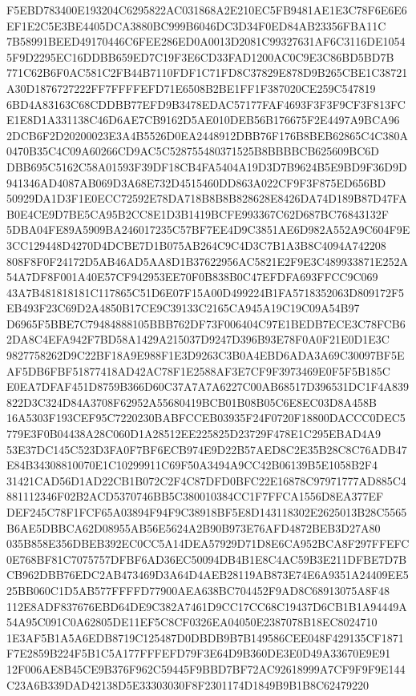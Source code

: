 \documentclass[UTF8,fontset=fandol,zihao=-4,a4paper]{ctexart}
\begin{document}
{{F5EBD783400E193204C6295822AC031868A2E210EC5FB9481AE1E3C78F6E6E6EF1E2C5E3BE4405DCA3880BC999B6046DC3D34F0ED84AB23356FBA11C
7B58991BEED49170446C6FEE286ED0A0013D2081C99327631AF6C3116DE10545F9D2295EC16DDBB659ED7C19F3E6CD33FAD1200AC0C9E3C86BD5BD7B
771C62B6F0AC581C2FB44B7110FDF1C71FD8C37829E878D9B265CBE1C38721A30D1876727222FF7FFFFEFD71E6508B2BE1FF1F387020CE259C547819
6BD4A83163C68CDDBB77EFD9B3478EDAC57177FAF4693F3F3F9CF3F813FCE1E8D1A331138C46D6AE7CB9162D5AE010DEB56B176675F2E4497A9BCA96
2DCB6F2D20200023E3A4B5526D0EA2448912DBB76F176B8BEB62865C4C380A0470B35C4C09A60266CD9AC5C528755480371525B8BBBBCB625609BC6D
DBB695C5162C58A01593F39DF18CB4FA5404A19D3D7B9624B5E9BD9F36D9D941346AD4087AB069D3A68E732D4515460DD863A022CF9F3F875ED656BD
50929DA1D3F1E0ECC72592E78DA718B8B8B828628E8426DA74D189B87D47FAB0E4CE9D7BE5CA95B2CC8E1D3B1419BCFE993367C62D687BC76843132F
5DBA04FE89A5909BA246017235C57BF7EE4D9C3851AE6D982A552A9C604F9E3CC129448D4270D4DCBE7D1B075AB264C9C4D3C7B1A3B8C4094A742208
808F8F0F24172D5AB46AD5AA8D1B37622956AC5821E2F9E3C489933871E252A54A7DF8F001A40E57CF942953EE70F0B838B0C47EFDFA693FFCC9C069
43A7B481818181C117865C51D6E07F15A00D499224B1FA5718352063D809172F5EB493F23C69D2A4850B17CE9C39133C2165CA945A19C19C09A54B97
D6965F5BBE7C79484888105BBB762DF73F006404C97E1BEDB7ECE3C78FCB62DA8C4EFA942F7BD58A1429A215037D9247D396B93E78F0A0F21E0D1E3C
9827758262D9C22BF18A9E988F1E3D9263C3B0A4EBD6ADA3A69C30097BF5EAF5DB6FBF51877418AD42AC78F1E2588AF3E7CF9F3973469E0F5F5B185C
E0EA7DFAF451D8759B366D60C37A7A7A6227C00AB68517D396531DC1F4A839822D3C324D84A3708F62952A55680419BCB01B08B05C6E8EC03D8A458B
16A5303F193CEF95C7220230BABFCCEB03935F24F0720F18800DACCC0DEC5779E3F0B04438A28C060D1A28512EE225825D23729F478E1C295EBAD4A9
53E37DC145C523D3FA0F7BF6ECB974E9D22B57AED8C2E35B28C8C76ADB47E84B34308810070E1C10299911C69F50A3494A9CC42B06139B5E1058B2F4
31421CAD56D1AD22CB1B072C2F4C87DFD0BFC22E16878C97971777AD885C4881112346F02B2ACD5370746BB5C380010384CC1F7FFCA1556D8EA377EF
DEF245C78F1FCF65A03894F94F9C38918BF5E8D143118302E2625013B28C5565B6AE5DBBCA62D08955AB56E5624A2B90B973E76AFD4872BEB3D27A80
035B858E356DBEB392EC0CC5A14DEA57929D71D8E6CA952BCA8F297FFEFC0E768BF81C7075757DFBF6AD36EC50094DB4B1E8C4AC59B3E211DFBE7D7B
CB962DBB76EDC2AB473469D3A64D4AEB28119AB873E74E6A9351A24409EE525BB060C1D5AB577FFFFD77900AEA638BC704452F9AD8C68913075A8F48
112E8ADF837676EBD64DE9C382A7461D9CC17CC68C19437D6CB1B1A94449A54A95C091C0A62805DE11EF5C8CF0326EA04050E2387078B18EC8024710
1E3AF5B1A5A6EDB8719C125487D0DBDB9B7B149586CEE048F429135CF1871F7E2859B224F5B1C5A177FFFEFD79F3E64D9B360DE3E0D49A33670E9E91
12F006AE8B45CE9B376F962C59445F9BBD7BF72AC92618999A7CF9F9F9E144C23A6B339DAD42138D5E33303030F8F2301174D1849B9B1B8C62479220
}}
\end{document}
